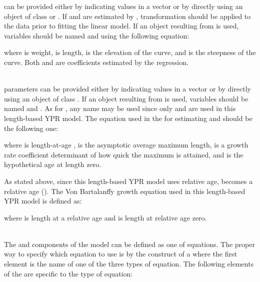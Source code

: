 \documentclass[a4paper]{book}
\begin{document}
\begin{Details}\relax
{} can be provided either by indicating  values in a vector or by 
directly using an object of class  or . If \eqn{\alpha}{} and \eqn{\beta}{} are estimated 
by ,  transformation should be applied to the data prior to fitting the linear model. 
If an object resulting from  is used, variables should be named  and  
using the following equation:

where  is weight,  is length, \eqn{\alpha}{} is the elevation of the curve, and \eqn{\beta}{} 
is the steepness of the curve. Both \eqn{\alpha}{} and \eqn{\beta}{} are coefficients estimated by the regression.\\{}\\{}


 parameters can be provided either by indicating  values in a vector or by 
directly using an object of class . If an object resulting from  is used, variables 
should be named  and . As for , any name may be used since only  and  are 
used in this length-based YPR model. The equation used in the  for estimating  
and  should be the following one:

where  is length-at-age ,  is the asymptotic average maximum length, 
 is a growth rate coefficient determinant of how quick the maximum is attained, and  
is the hypothetical age at length zero.

As stated above, since this length-based YPR model uses relative age,  becomes a relative age (). 
The Von Bartalanffy growth equation used in this length-based YPR model is defined as:

where  is length at a relative age  and  is length at relative age zero.\\{}\\{}


The  and  components of the model can be defined 
as one of  equations. The proper way to specify which equation to use is by 
the construct of a  where the first element is the name of one of the three types of equation. 
The following elements of the  are specific to the type of equation:
\begin{itemize}


\end{itemize}
\end{Details}
\end{document}
